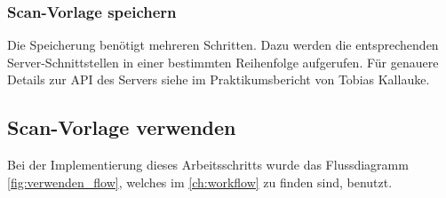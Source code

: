 \documentclass[notables, nomenclature, oneside, 150]{HSMW-Thesis}
\begin{document}
			\subsubsection*{Scan-Vorlage speichern}
				Die Speicherung benötigt mehreren Schritten. Dazu werden die entsprechenden Server-Schnittstellen in einer bestimmten Reihenfolge aufgerufen. Für genauere Details zur API des Servers siehe im Praktikumsbericht von Tobias Kallauke.
				
			
			
		\newpage
		\subsection{Scan-Vorlage verwenden}
			Bei der Implementierung dieses Arbeitsschritts wurde das Flussdiagramm \ref{fig:verwenden_flow}, welches im \autoref{ch:workflow} zu finden sind, benutzt.
			
\end{document}
